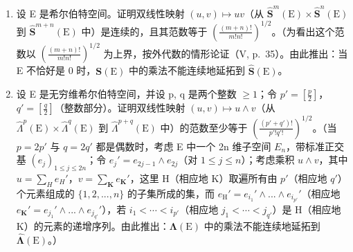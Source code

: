 \exercisegroup

\begin{enumerate}
\def\labelenumi{\arabic{enumi})}
\tightlist
\item
  设 E 是希尔伯特空间。证明双线性映射 \((u, v) \mapsto uv\)（从 \(\hat{\mathbf{S}}^{m}(\mathrm{E}) \times \hat{\mathbf{S}}^{n}(\mathrm{E})\) 到 \(\hat{\mathbf{S}}^{m+n}(\mathrm{E})\) 中）是连续的，且其范数等于 \(\left(\frac{(m+n)!}{m! n!}\right)^{1/2}\)。（为看出这个范数以 \(\left(\frac{(m+n)!}{m! n!}\right)^{1/2}\) 为上界，按外代数的情形论证（V, p.~35）。由此推出：当 E 不恰好是 0 时，\(\mathbf{S}(\mathrm{E})\) 中的乘法不能连续地延拓到 \(\hat{\mathbf{S}}(\mathrm{E})\)。
\item
  设 E 是无穷维希尔伯特空间，并设 p, q 是两个整数 \(\geqslant 1\)；令 \(p' = \left[\frac{p}{2}\right]\)，\(q' = \left[\frac{q}{2}\right]\)（整数部分）。证明双线性映射 \((u, v) \mapsto u \wedge v\)（从 \(\hat{\Lambda}^{p}(\mathrm{E}) \times \hat{\Lambda}^{q}(\mathrm{E})\) 到 \(\hat{\Lambda}^{p+q}(\mathrm{E})\) 中）的范数至少等于 \(\left(\frac{(p' + q')!}{p'! q'!}\right)^{1/2}\)。（当 \(p = 2p'\) 与 \(q = 2q'\) 都是偶数时，考虑 E 中一个 2n 维子空间 \(E_{n}\)，带标准正交基 \((e_{j})_{1 \leqslant j \leqslant 2n}\)；令 \(e_{j}' = e_{2j-1} \wedge e_{2j}\)（对 \(1 \leqslant j \leqslant n\)）；考虑乘积 \(u \wedge v\)，其中 \(u = \sum_{H} e_{H}'\)，\(v = \sum_{\mathbf{K}} e_{\mathbf{K}}'\)，这里 H（相应地 K）取遍所有由 \(p'\)（相应地 \(q'\)）个元素组成的 \(\{1, 2, ..., n\}\) 的子集所成的集，而 \(e_{\mathrm{H}}' = e_{i_1}' \wedge ... \wedge e_{i_{p'}}'\)（相应地 \(e_{\mathbf{K}}' = e_{j_1}' \wedge ... \wedge e_{j_{q'}}'\)），若 \(i_1 < \cdots < i_{p'}\)（相应地 \(j_1 < \cdots < j_{q'}\)）是 H（相应地 K）的元素的递增序列。由此推出：\(\boldsymbol{\Lambda}(\mathrm{E})\) 中的乘法不能连续地延拓到 \(\hat{\boldsymbol{\Lambda}}(\mathrm{E})\)。）
\end{enumerate}
\relax{}
